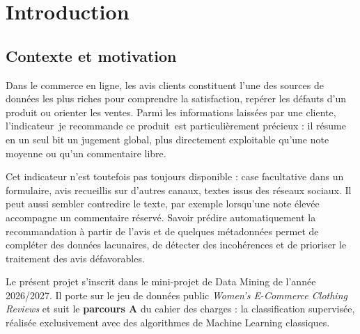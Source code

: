 \documentclass[11pt,a4paper]{report}
\def\og{\guillemotleft\nobreak\,}%
\def\fg{\unskip\nobreak\,\guillemotright}%
\newcommand{\gl}[1]{\og #1\fg{}}       %
\numberwithin{equation}{chapter}
\begin{document}
\chapter{Introduction}\label{chap:intro}

\section{Contexte et motivation}
Dans le commerce en ligne, les avis clients constituent l'une des sources de données les plus riches pour comprendre la satisfaction, repérer les défauts d'un produit ou orienter les ventes. Parmi les informations laissées par une cliente, l'indicateur \gl{je recommande ce produit} est particulièrement précieux : il résume en un seul bit un jugement global, plus directement exploitable qu'une note moyenne ou qu'un commentaire libre.

Cet indicateur n'est toutefois pas toujours disponible : case facultative dans un formulaire, avis recueillis sur d'autres canaux, textes issus des réseaux sociaux. Il peut aussi sembler contredire le texte, par exemple lorsqu'une note élevée accompagne un commentaire réservé. Savoir prédire automatiquement la recommandation à partir de l'avis et de quelques métadonnées permet de compléter des données lacunaires, de détecter des incohérences et de prioriser le traitement des avis défavorables.

Le présent projet s'inscrit dans le mini-projet de Data Mining de l'année 2026/2027. Il porte sur le jeu de données public \textit{Women's E-Commerce Clothing Reviews} et suit le \textbf{parcours A} du cahier des charges : la classification supervisée, réalisée exclusivement avec des algorithmes de Machine Learning classiques.
\end{document}
